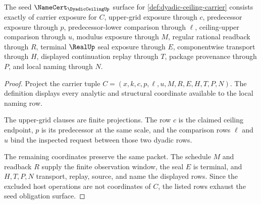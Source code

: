 \begin{theorem}
\label{thm:dyadic-ceiling-namecert-obligations}
The seed $\NameCert_{\DyadicCeilingUp}$ surface for \autoref{def:dyadic-ceiling-carrier} consists exactly of carrier exposure for $C$, upper-grid exposure through $c$, predecessor exposure through $p$, predecessor-lower comparison through $\ell$, ceiling-upper comparison through $u$, modulus exposure through $M$, regular rational readback through $R$, terminal $\RealUp$ seal exposure through $E$, componentwise transport through $H$, displayed continuation replay through $T$, package provenance through $P$, and local naming through $N$.
\end{theorem}
\begin{proof}
Project the carrier tuple $C=(x,k,c,p,\ell,u,M,R,E,H,T,P,N)$. The definition displays every analytic and structural coordinate available to the local naming row.

The upper-grid clauses are finite projections. The row $c$ is the claimed ceiling endpoint, $p$ is its predecessor at the same scale, and the comparison rows $\ell$ and $u$ bind the inspected request between those two dyadic rows.

The remaining coordinates preserve the same packet. The schedule $M$ and readback $R$ supply the finite observation window, the seal $E$ is terminal, and $H,T,P,N$ transport, replay, source, and name the displayed rows. Since the excluded host operations are not coordinates of $C$, the listed rows exhaust the seed obligation surface.
\end{proof}


